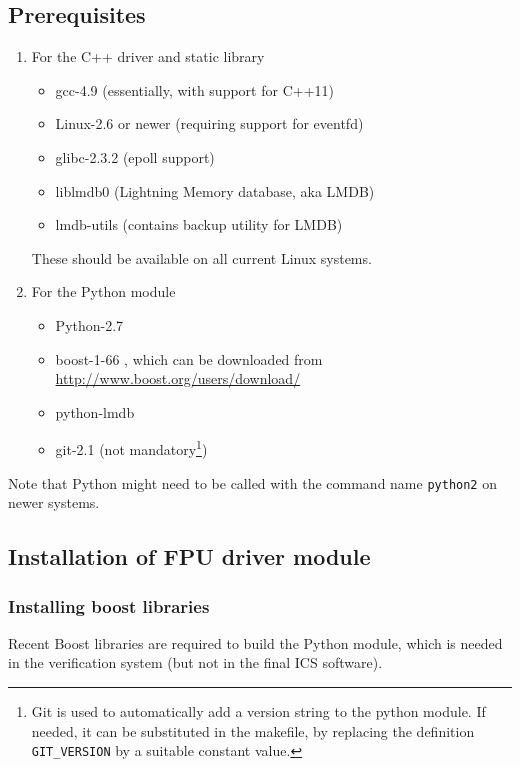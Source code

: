 \documentclass[11pt,a4paper]{scrartcl}
\begin{document}
\subsection{Prerequisites}

\begin{enumerate}
  \item For the C++ driver and static library

    
\begin{itemize}
\item gcc-4.9 (essentially, with support for C++11)
\item Linux-2.6 or newer (requiring support for eventfd)
\item glibc-2.3.2 (epoll support)
\item liblmdb0 (Lightning Memory database, aka LMDB)
\item lmdb-utils (contains backup utility for LMDB)
\end{itemize}

These should be available on all current Linux systems.

\item For the Python module

\begin{itemize}
\item Python-2.7
\item boost-1-66 , which can be downloaded from \url{http://www.boost.org/users/download/}
\item python-lmdb
\item git-2.1 (not mandatory\footnote{Git is used to automatically add a version
  string to the python module. If needed, it can be substituted in the
  makefile, by replacing the definition \texttt{GIT\_VERSION} by a
  suitable constant value.})
\end{itemize}
\end{enumerate}


Note that Python might need to be called with the command name
\texttt{python2} on newer systems.

\subsection{Installation of FPU driver module}
\subsubsection{Installing boost libraries}
Recent Boost libraries are required to build the Python module, which
is needed in the verification system (but not in the final ICS
software).
\end{document}
